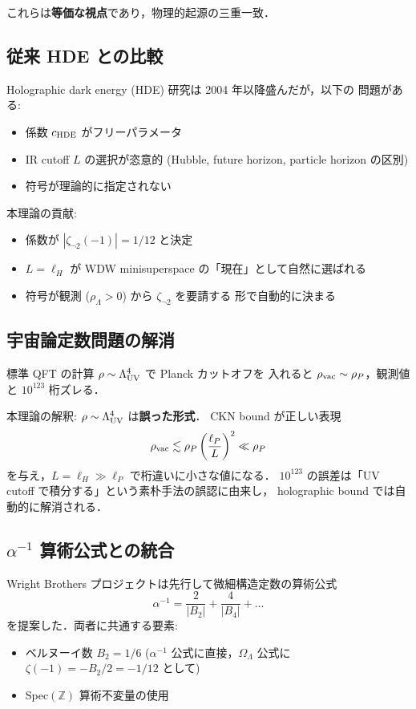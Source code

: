\documentclass[11pt,a4paper]{article}
\begin{document}
これらは\textbf{等価な視点}であり，物理的起源の三重一致．

\subsection{従来 HDE との比較}

Holographic dark energy (HDE) 研究は 2004 年以降盛んだが，以下の
問題がある:
\begin{itemize}
\item 係数 $c_{\rm HDE}$ がフリーパラメータ
\item IR cutoff $L$ の選択が恣意的 (Hubble, future horizon, particle
horizon の区別)
\item 符号が理論的に指定されない
\end{itemize}

本理論の貢献:
\begin{itemize}
\item 係数が $|\zeta_{\neg 2}(-1)| = 1/12$ と決定
\item $L = \ell_H$ が WDW minisuperspace の「現在」として自然に選ばれる
\item 符号が観測 ($\rho_\Lambda > 0$) から $\zeta_{\neg 2}$ を要請する
形で自動的に決まる
\end{itemize}

\subsection{宇宙論定数問題の解消}

標準 QFT の計算 $\rho \sim \Lambda_{\rm UV}^4$ で Planck カットオフを
入れると $\rho_{\rm vac} \sim \rho_P$，観測値と $10^{123}$ 桁ズレる．

本理論の解釈: $\rho \sim \Lambda_{\rm UV}^4$ は\textbf{誤った形式}．
CKN bound が正しい表現
\begin{equation}
\rho_{\rm vac} \lesssim \rho_P\left(\frac{\ell_P}{L}\right)^2 \ll \rho_P
\end{equation}
を与え，$L = \ell_H \gg \ell_P$ で桁違いに小さな値になる．
$10^{123}$ の誤差は「UV cutoff で積分する」という素朴手法の誤認に由来し，
holographic bound では自動的に解消される．

\subsection{$\alpha^{-1}$ 算術公式との統合}

Wright Brothers プロジェクトは先行して微細構造定数の算術公式
~\cite{alphaArithmetic}
\begin{equation}
\alpha^{-1} = \frac{2}{|B_2|} + \frac{4}{|B_4|} + \ldots
\end{equation}
を提案した．両者に共通する要素:
\begin{itemize}
\item ベルヌーイ数 $B_2 = 1/6$ ($\alpha^{-1}$ 公式に直接，$\Omega_\Lambda$
公式に $\zeta(-1) = -B_2/2 = -1/12$ として)
\item Spec$(\mathbb{Z})$ 算術不変量の使用
\end{itemize}
\end{document}
